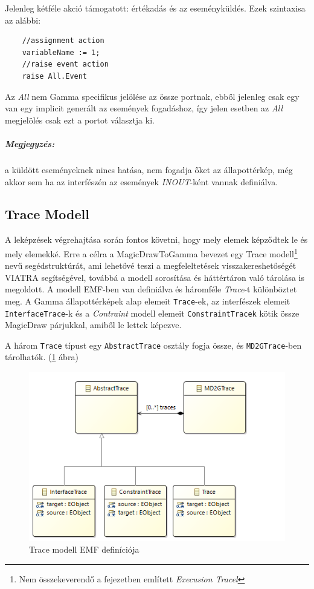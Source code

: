 Jelenleg kétféle akció támogatott: értékadás és az eseményküldés. Ezek szintaxisa az alábbi:

\begin{lstlisting}
	//assignment action
	variableName := 1;
	//raise event action
	raise All.Event
\end{lstlisting}

Az \emph{All} nem Gamma specifikus jelölése az össze portnak, ebből jelenleg csak egy van egy implicit generált az események fogadáshoz, így jelen esetben az \emph{All} megjelölés csak ezt a portot választja ki.

\subparagraph{Megjegyzés:} a küldött eseményeknek nincs hatása, nem fogadja őket az állapottérkép, még akkor sem ha az interfészén az események \emph{INOUT}-ként vannak definiálva.

\subsection{Trace Modell}
\label{sec:trace_model}
A leképzések végrehajtása során fontos követni, hogy mely elemek képződtek le és mely elemekké. Erre a célra a MagicDrawToGamma bevezet egy Trace modell\footnote{Nem összekeverendő a  fejezetben említett \emph{Execusion Tracel}} nevű segédstruktúrát, ami lehetővé teszi a megfeleltetések visszakereshetőségét VIATRA segítségével, továbbá a modell sorosítása és háttértáron való tárolása is megoldott. A modell EMF-ben van definiálva és  háromféle \emph{Trace}-t különböztet meg. A Gamma állapottérképek alap elemeit \verb+Trace+-ek, az interfészek elemeit \verb+InterfaceTrace+-k és a \emph{Contraint} modell elemeit \verb+ConstraintTracek+ kötik össze MagicDraw párjukkal, amiből le lettek képezve.

A három \verb+Trace+ típust egy \verb+AbstractTrace+ osztály fogja össze, és \verb+MD2GTrace+-ben tárolhatók. (\ref{fig:trace-model} ábra)

\begin{figure}[ht]
	\centering
	\includegraphics[keepaspectratio, width=140mm]{figures/trace-model.png}
	\caption{Trace modell EMF definíciója}
	\label{fig:trace-model}
\end{figure}


